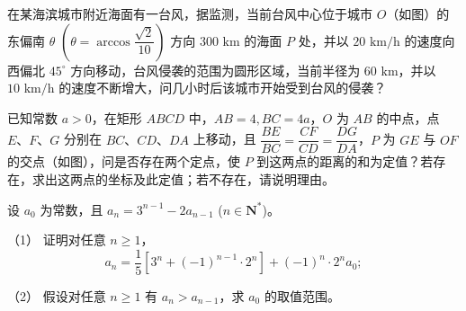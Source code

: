 \begin{question}
在某海滨城市附近海面有一台风，据监测，当前台风中心位于城市 $O$（如图）的东偏南 $\theta$ $\left(\theta = \arccos\dfrac{\sqrt{2}}{10}\right)$ 方向 $300\text{ km}$ 的海面 $P$ 处，并以 $20\text{ km/h}$ 的速度向西偏北 $45^\circ$ 方向移动，台风侵袭的范围为圆形区域，当前半径为 $60\text{ km}$，并以 $10\text{ km/h}$ 的速度不断增大，问几小时后该城市开始受到台风的侵袭？
\nopagebreak[4]
\begin{center}\end{center}
\nopagebreak[4]
\Needspace{0.4\textheight}
\end{question}
\begin{question}
已知常数 $a > 0$，在矩形 $ABCD$ 中，$AB = 4, BC = 4a$，$O$ 为 $AB$ 的中点，点 $E\text{、}F\text{、}G$ 分别在 $BC\text{、}CD\text{、}DA$ 上移动，且 $\dfrac{BE}{BC} = \dfrac{CF}{CD} = \dfrac{DG}{DA}$，$P$ 为 $GE$ 与 $OF$ 的交点（如图），问是否存在两个定点，使 $P$ 到这两点的距离的和为定值？若存在，求出这两点的坐标及此定值；若不存在，请说明理由。
\nopagebreak[4]
\begin{center}\end{center}
\nopagebreak[4]
\end{question}
\begin{question}
设 $a_0$ 为常数，且 $a_n = 3^{n-1} - 2a_{n-1}$ ($n \in \mathbf{N}^*$)。

（1） 证明对任意 $n \ge 1$，
\nopagebreak[4]
\[a_n = \dfrac{1}{5}[3^n + (-1)^{n-1} \cdot 2^n] + (-1)^n \cdot 2^n a_0;\]

（2） 假设对任意 $n \ge 1$ 有 $a_n > a_{n-1}$，求 $a_0$ 的取值范围。

\end{question}